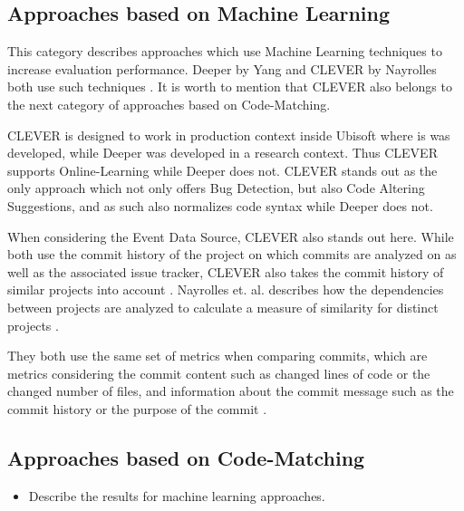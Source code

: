 \subsection{Approaches based on Machine Learning}

This category describes approaches which use Machine Learning techniques to increase evaluation performance. Deeper by Yang and CLEVER by Nayrolles both use such techniques \cite{Nayrolles2018, Yang2015}. It is worth to mention that CLEVER also belongs to the next category of approaches based on Code-Matching.

CLEVER is designed to work in production context inside Ubisoft where is was developed, while Deeper was developed in a research context. Thus CLEVER supports Online-Learning while Deeper does not. CLEVER stands out as the only approach which not only offers Bug Detection, but also Code Altering Suggestions, and as such also normalizes code syntax while Deeper does not. \cite{Nayrolles2018, Yang2015}

When considering the Event Data Source, CLEVER also stands out here. While both use the commit history of the project on which commits are analyzed on as well as the associated issue tracker, CLEVER also takes the commit history of similar projects into account \cite{Nayrolles2018, Yang2015}. Nayrolles et. al. describes how the dependencies between projects are analyzed to calculate a measure of similarity for distinct projects \cite{Nayrolles2018}.


They both use the same set of metrics when comparing commits, which are metrics considering the commit content such as changed lines of code or the changed number of files, and information about the 
commit message %
such as the commit history or the purpose of the commit \cite{Nayrolles2018, Yang2015}.

\subsection{Approaches based on Code-Matching}
\begin{itemize}
\item Describe the results for machine learning approaches.
\end{itemize}

